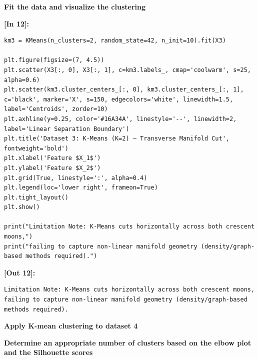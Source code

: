 \vspace{0.3em}
\begin{tcolorbox}[colback=gray!5!white,colframe=gray!50!black,boxrule=0.5pt,arc=2pt,left=4pt,right=4pt,top=2pt,bottom=2pt,unbreakable,before upper={\sloppy\raggedright}]
{\small\bfseries Fit the data and visualize the clustering\par}
\end{tcolorbox}

\vspace{0.4em}
\noindent\textbf{\small [In 12]:}
\begin{lstlisting}[style=pycode]
km3 = KMeans(n_clusters=2, random_state=42, n_init=10).fit(X3)

plt.figure(figsize=(7, 4.5))
plt.scatter(X3[:, 0], X3[:, 1], c=km3.labels_, cmap='coolwarm', s=25, alpha=0.6)
plt.scatter(km3.cluster_centers_[:, 0], km3.cluster_centers_[:, 1], c='black', marker='X', s=150, edgecolors='white', linewidth=1.5, label='Centroids', zorder=10)
plt.axhline(y=0.25, color='#16A34A', linestyle='--', linewidth=2, label='Linear Separation Boundary')
plt.title('Dataset 3: K-Means (K=2) — Transverse Manifold Cut', fontweight='bold')
plt.xlabel('Feature $X_1$')
plt.ylabel('Feature $X_2$')
plt.grid(True, linestyle=':', alpha=0.4)
plt.legend(loc='lower right', frameon=True)
plt.tight_layout()
plt.show()

print("Limitation Note: K-Means cuts horizontally across both crescent moons,")
print("failing to capture non-linear manifold geometry (density/graph-based methods required).")
\end{lstlisting}
\noindent\textbf{\small [Out 12]:}
\begin{lstlisting}[style=output]
Limitation Note: K-Means cuts horizontally across both crescent moons,
failing to capture non-linear manifold geometry (density/graph-based methods required).
\end{lstlisting}

\vspace{0.3em}
\begin{tcolorbox}[colback=gray!5!white,colframe=gray!50!black,boxrule=0.5pt,arc=2pt,left=4pt,right=4pt,top=2pt,bottom=2pt,unbreakable,before upper={\sloppy\raggedright}]
{\small\bfseries Apply K-mean clustering to dataset 4\par}
\end{tcolorbox}

\vspace{0.3em}
\begin{tcolorbox}[colback=gray!5!white,colframe=gray!50!black,boxrule=0.5pt,arc=2pt,left=4pt,right=4pt,top=2pt,bottom=2pt,unbreakable,before upper={\sloppy\raggedright}]
{\small\bfseries Determine an appropriate number of clusters based on the elbow plot and the Silhouette scores\par}
\end{tcolorbox}

